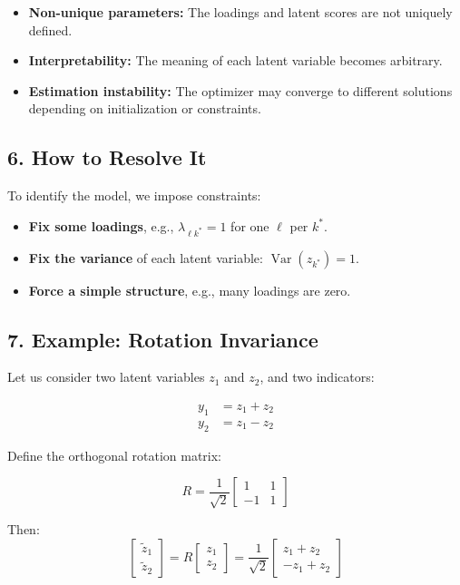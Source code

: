 \documentclass[12pt,a4paper]{article}
\begin{document}
\begin{itemize}
    \item \textbf{Non-unique parameters:} The loadings and latent scores are not uniquely defined.
    \item \textbf{Interpretability:} The meaning of each latent variable becomes arbitrary.
    \item \textbf{Estimation instability:} The optimizer may converge to different solutions depending on initialization or constraints.
\end{itemize}

\subsection{6. How to Resolve It}

To identify the model, we impose constraints:

\begin{itemize}
    \item \textbf{Fix some loadings}, e.g., $\lambda_{\ell k^*} = 1$ for one $\ell$ per $k^*$.
    \item \textbf{Fix the variance} of each latent variable: $\operatorname{Var}(z_{k^*}) = 1$.
    \item \textbf{Force a simple structure}, e.g., many loadings are zero.
\end{itemize}

\subsection{7. Example: Rotation Invariance}

Let us consider two latent variables $z_1$ and $z_2$, and two indicators:

\[
\begin{aligned}
y_1 &= z_1 + z_2 \\
y_2 &= z_1 - z_2
\end{aligned}
\]

Define the orthogonal rotation matrix:

\[
R = \frac{1}{\sqrt{2}} \begin{bmatrix}
1 & 1 \\
-1 & 1
\end{bmatrix}
\]

Then:
\[
\begin{bmatrix}
\tilde{z}_1 \\
\tilde{z}_2
\end{bmatrix}
=
R \begin{bmatrix}
z_1 \\
z_2
\end{bmatrix}
=
\frac{1}{\sqrt{2}} \begin{bmatrix}
z_1 + z_2 \\
-z_1 + z_2
\end{bmatrix}
\]
\end{document}
